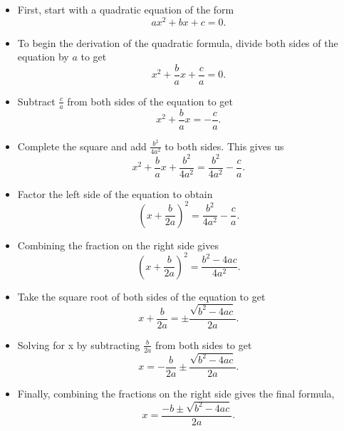 \documentclass{article}
\begin{document}
\begin{itemize}
    \item First, start with a quadratic equation of the form 
    \begin{equation*}
        ax^2+bx+c=0.
    \end{equation*}
    \item To begin the derivation of the quadratic formula, divide both sides of the equation by $a$ to get 
    \begin{equation*}
        x^2+\frac{b}{a}x+\frac{c}{a}=0.
    \end{equation*}
    \item Subtract $\frac{c}{a}$ from both sides of the equation to get 
    \begin{equation*}
        x^2+\frac{b}{a}x=-\frac{c}{a}.
    \end{equation*}
    \item Complete the square and add $\frac{b^2}{4a^2}$ to both sides. This gives us 
    \begin{equation*}
        x^2+\frac{b}{a}x+\frac{b^2}{4a^2}=\frac{b^2}{4a^2}-\frac{c}{a}.
    \end{equation*}
    \item Factor the left side of the equation to obtain 
    \begin{equation*}
        (x+\frac{b}{2a})^2=\frac{b^2}{4a^2}-\frac{c}{a}.
    \end{equation*}
    \item Combining the fraction on the right side gives 
    \begin{equation*}
        (x+\frac{b}{2a})^2=\frac{b^2-4ac}{4a^2}.
    \end{equation*}
    \item Take the square root of both sides of the equation to get 
    \begin{equation*}
        x+\frac{b}{2a}=\pm\frac{\sqrt{b^2-4ac}}{2a}.
    \end{equation*}
    \item Solving for x by subtracting $\frac{b}{2a}$ from both sides to get 
    \begin{equation*}
        x=-\frac{b}{2a}\pm\frac{\sqrt{b^2-4ac}}{2a}.
    \end{equation*}
    \item Finally, combining the fractions on the right side gives the final formula,
    \begin{equation*}
        x=\frac{-b\pm\sqrt{b^2-4ac}}{2a}.
    \end{equation*}
\end{itemize}
\end{document}
